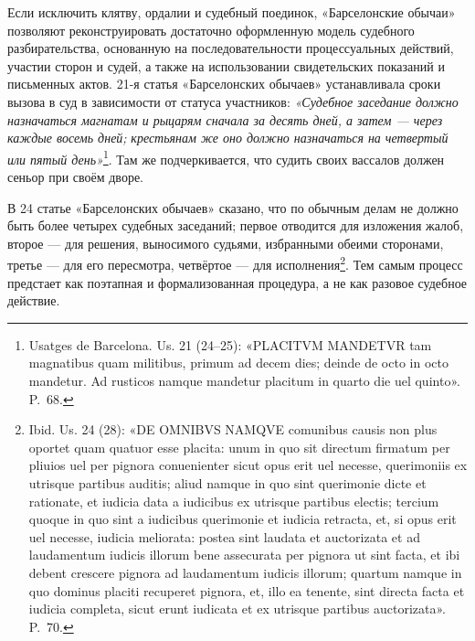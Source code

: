 Если исключить клятву, ордалии и судебный поединок, «Барселонские обычаи» позволяют реконструировать достаточно оформленную модель судебного разбирательства, основанную на последовательности процессуальных действий, участии сторон и судей, а также на использовании свидетельских показаний и письменных актов. 21-я статья «Барселонских обычаев» устанавливала сроки вызова в суд в зависимости от статуса участников: \emph{«Судебное заседание должно назначаться магнатам и рыцарям сначала за десять дней, а затем --- через каждые восемь дней; }\emph{крестьянам же оно должно назначаться на четвертый или пятый день»}\footnote{Usatges de Barcelona. Us. 21 (24--25): «PLACITVM MANDETVR tam magnatibus quam militibus, primum ad decem dies; deinde de octo in octo mandetur. Ad rusticos namque mandetur placitum in quarto die uel quinto». P.~68.}. Там же подчеркивается, что судить своих вассалов должен сеньор при своём дворе.

В 24 статье «Барселонских обычаев» сказано, что по обычным делам не должно быть более четырех судебных заседаний; первое отводится для изложения жалоб, второе --- для решения, выносимого судьями, избранными обеими сторонами, третье --- для его пересмотра, четвёртое --- для исполнения\footnote{Ibid. Us. 24 (28): «DE OMNIBVS NAMQVE comunibus causis non plus oportet quam quatuor esse placita: unum in quo sit directum firmatum per pliuios uel per pignora conuenienter sicut opus erit uel necesse, querimoniis ex utrisque partibus auditis; aliud namque in quo sint querimonie dicte et rationate, et iudicia data a iudicibus ex utrisque partibus electis; tercium quoque in quo sint a iudicibus querimonie et iudicia retracta, et, si opus erit uel necesse, iudicia meliorata: postea sint laudata et auctorizata et ad laudamentum iudicis illorum bene assecurata per pignora ut sint facta, et ibi debent crescere pignora ad laudamentum iudicis illorum; quartum namque in quo dominus placiti recuperet pignora, et, illo ea tenente, sint directa facta et iudicia completa, sicut erunt iudicata et ex utrisque partibus auctorizata». P.~70.}. Тем самым процесс предстает как поэтапная и формализованная процедура, а не как разовое судебное действие.

